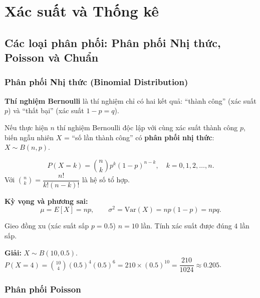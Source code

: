 \documentclass[12pt,a4paper]{article}
\begin{document}
\section{Xác suất và Thống kê}

\subsection{Các loại phân phối: Phân phối Nhị thức, Poisson và Chuẩn}

\subsubsection{Phân phối Nhị thức (Binomial Distribution)}

\begin{dinhnghia}[title={Thí nghiệm Bernoulli và phân phối nhị thức}]
  \textbf{Thí nghiệm Bernoulli} là thí nghiệm chỉ có hai kết quả: ``thành công'' (xác suất $p$) và ``thất bại'' (xác suất $1-p = q$).

  Nếu thực hiện $n$ thí nghiệm Bernoulli độc lập với cùng xác suất thành công $p$, biến ngẫu nhiên $X$ = ``số lần thành công'' có \textbf{phân phối nhị thức}: $X \sim B(n, p)$.
\end{dinhnghia}

\begin{congthuc}[title={Phân phối nhị thức}]
  \[
    P(X = k) = \binom{n}{k} p^k (1-p)^{n-k}, \quad k = 0, 1, 2, \ldots, n.
  \]
  Với $\binom{n}{k} = \dfrac{n!}{k!(n-k)!}$ là hệ số tổ hợp.

  \textbf{Kỳ vọng và phương sai:}
  \[
    \mu = E[X] = np, \qquad \sigma^2 = \text{Var}(X) = np(1-p) = npq.
  \]
\end{congthuc}

\begin{vidu}
  Gieo đồng xu (xác suất sấp $p=0.5$) $n=10$ lần. Tính xác suất được đúng $4$ lần sấp.

  \medskip\textbf{Giải:}
  $X \sim B(10, 0.5)$.
  $P(X=4) = \binom{10}{4}(0.5)^4(0.5)^6 = 210 \times (0.5)^{10} = \dfrac{210}{1024} \approx 0.205$.
\end{vidu}

\subsubsection{Phân phối Poisson}
\end{document}
